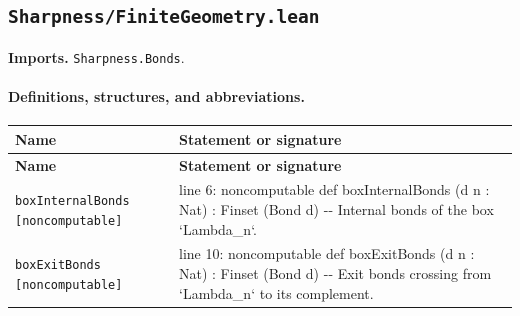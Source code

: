 \documentclass[10pt]{article}
\newcommand{\module}[1]{\texttt{#1}}
\begin{document}
\subsection*{\module{Sharpness/FiniteGeometry.lean}}
\textbf{Imports.} \module{Sharpness.Bonds}.
\paragraph{Definitions, structures, and abbreviations.}
\begin{longtable}{>{\raggedright\arraybackslash}p{} >{\raggedright\arraybackslash}p{}}
\textbf{Name} & \textbf{Statement or signature} \\
\hline
\endfirsthead
\textbf{Name} & \textbf{Statement or signature} \\
\hline
\endhead
\texttt{boxInternalBonds [noncomputable]} & {\ttfamily\scriptsize line 6:\allowbreak{} noncomputable def boxInternalBonds (\allowbreak{}d n :\allowbreak{} Nat)\allowbreak{} :\allowbreak{} Finset (\allowbreak{}Bond d)\allowbreak{} -\allowbreak{}-\allowbreak{} Internal bonds of the box `Lambda\_\allowbreak{}n`.\allowbreak{}} \\[0.45em]
\texttt{boxExitBonds [noncomputable]} & {\ttfamily\scriptsize line 10:\allowbreak{} noncomputable def boxExitBonds (\allowbreak{}d n :\allowbreak{} Nat)\allowbreak{} :\allowbreak{} Finset (\allowbreak{}Bond d)\allowbreak{} -\allowbreak{}-\allowbreak{} Exit bonds crossing from `Lambda\_\allowbreak{}n` to its complement.\allowbreak{}} \\[0.45em]
\end{longtable}
\end{document}
